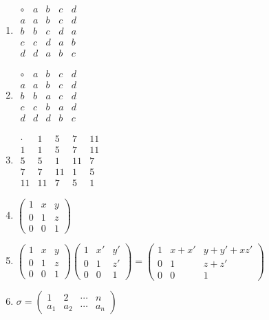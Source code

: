 \documentclass[oneside,10pt,]{article}
\begin{document}
\begin{enumerate}
\item{}\(\begin{array}{c|cccc} \circ & a & b & c & d \\ \hline a & a & b & c & d \\ b & b & c & d & a \\ c & c & d & a & b \\ d & d & a & b & c \end{array}\)%
\item{}\(\begin{array}{c|cccc} \circ & a & b & c & d \\ \hline a & a & b & c & d \\ b & b & a & c & d \\ c & c & b & a & d \\ d & d & d & b & c \end{array}\)%
\item{}\(\begin{array}{c|cccc} \cdot & 1 & 5 & 7 & 11 \\ \hline 1 & 1 & 5 & 7 & 11 \\ 5 & 5 & 1 & 11 & 7 \\ 7 & 7 & 11 & 1 & 5 \\ 11 & 11 & 7 & 5 & 1 \end{array}\)%
\item{}\(\begin{pmatrix} 1 & x & y \\ 0 & 1 & z \\ 0 & 0 & 1 \end{pmatrix}\)%
\item{}\(\begin{pmatrix} 1 & x & y \\ 0 & 1 & z \\ 0 & 0 & 1 \end{pmatrix} \begin{pmatrix} 1 & x' & y' \\ 0 & 1 & z' \\ 0 & 0 & 1 \end{pmatrix} = \begin{pmatrix} 1 & x+x' & y+y'+xz' \\ 0 & 1 & z+z' \\ 0 & 0 & 1 \end{pmatrix}\)%
\item{}\(\sigma = \begin{pmatrix} 1 & 2 & \cdots & n \\ a_1 & a_2 & \cdots & a_n \end{pmatrix}\)%

\end{enumerate}
\end{document}
